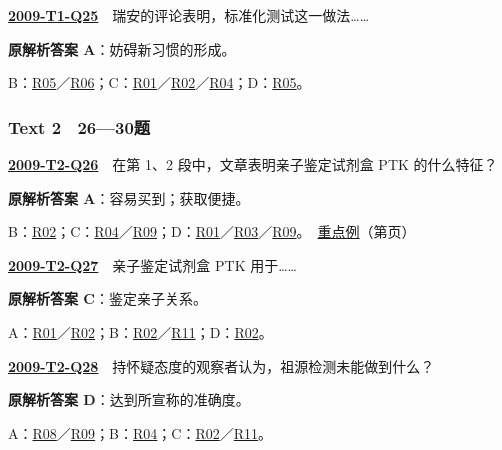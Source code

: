 \documentclass[11pt,a4paper]{article}
\begin{document}
\label{idx-2009-T1-Q25}\noindent\textbf{\href{https://zj139.github.io/math-notes/english/67d0fd0739843c9aede29847/\#q25}{2009-T1-Q25}}　瑞安的评论表明，标准化测试这一做法……\par\nopagebreak
\noindent\textbf{原解析答案 A}：妨碍新习惯的形成。\par\nopagebreak
\noindent B：\hyperref[cat-R05]{R05}／\hyperref[cat-R06]{R06}；C：\hyperref[cat-R01]{R01}／\hyperref[cat-R02]{R02}／\hyperref[cat-R04]{R04}；D：\hyperref[cat-R05]{R05}。\par\smallskip
{}\subsubsection{Text 2　26—30题}
\label{idx-2009-T2-Q26}\noindent\textbf{\href{https://zj139.github.io/math-notes/english/35e7c30a863ed5433f61ed2e/\#q26}{2009-T2-Q26}}　在第 1、2 段中，文章表明亲子鉴定试剂盒 PTK 的什么特征？\par\nopagebreak
\noindent\textbf{原解析答案 A}：容易买到；获取便捷。\par\nopagebreak
\noindent B：\hyperref[cat-R02]{R02}；C：\hyperref[cat-R04]{R04}／\hyperref[cat-R09]{R09}；D：\hyperref[cat-R01]{R01}／\hyperref[cat-R03]{R03}／\hyperref[cat-R09]{R09}。　\hyperref[case-2009-T2-Q26]{重点例}（第\pageref{case-2009-T2-Q26}页）\par\smallskip
{}\label{idx-2009-T2-Q27}\noindent\textbf{\href{https://zj139.github.io/math-notes/english/35e7c30a863ed5433f61ed2e/\#q27}{2009-T2-Q27}}　亲子鉴定试剂盒 PTK 用于……\par\nopagebreak
\noindent\textbf{原解析答案 C}：鉴定亲子关系。\par\nopagebreak
\noindent A：\hyperref[cat-R01]{R01}／\hyperref[cat-R02]{R02}；B：\hyperref[cat-R02]{R02}／\hyperref[cat-R11]{R11}；D：\hyperref[cat-R02]{R02}。\par\smallskip
{}\label{idx-2009-T2-Q28}\noindent\textbf{\href{https://zj139.github.io/math-notes/english/35e7c30a863ed5433f61ed2e/\#q28}{2009-T2-Q28}}　持怀疑态度的观察者认为，祖源检测未能做到什么？\par\nopagebreak
\noindent\textbf{原解析答案 D}：达到所宣称的准确度。\par\nopagebreak
\noindent A：\hyperref[cat-R08]{R08}／\hyperref[cat-R09]{R09}；B：\hyperref[cat-R04]{R04}；C：\hyperref[cat-R02]{R02}／\hyperref[cat-R11]{R11}。\par\smallskip
\end{document}
